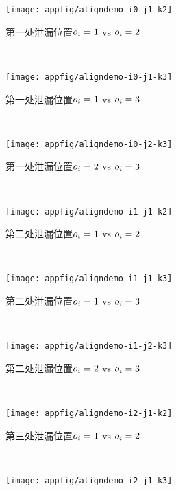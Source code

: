 {	\begin{appfig}[!htb]
		\centering
		\begin{subfigure}[b]{\trif\textwidth}
			\texttt{[image: appfig/aligndemo-i0-j1-k2]}
			\caption{第一处泄漏位置$o_i=1$ vs $o_i=2$}
			\label{fig:aligndemo012}
		\end{subfigure}%
		~%
		\begin{subfigure}[b]{\trif\textwidth}
			\texttt{[image: appfig/aligndemo-i0-j1-k3]}
			\caption{第一处泄漏位置$o_i=1$ vs $o_i=3$}
			\label{fig:aligndemo013}
		\end{subfigure}
		~%
		\begin{subfigure}[b]{\trif\textwidth}
			\texttt{[image: appfig/aligndemo-i0-j2-k3]}
			\caption{第一处泄漏位置$o_i=2$ vs $o_i=3$}
			\label{fig:aligndemo023}
		\end{subfigure}
		\\%
		\begin{subfigure}[b]{\trif\textwidth}
			\texttt{[image: appfig/aligndemo-i1-j1-k2]}
			\caption{第二处泄漏位置$o_i=1$ vs $o_i=2$}
			\label{fig:aligndemo112}
		\end{subfigure}%
		~%
		\begin{subfigure}[b]{\trif\textwidth}
			\texttt{[image: appfig/aligndemo-i1-j1-k3]}
			\caption{第二处泄漏位置$o_i=1$ vs $o_i=3$}
			\label{fig:aligndemo113}
		\end{subfigure}
		~%
		\begin{subfigure}[b]{\trif\textwidth}
			\texttt{[image: appfig/aligndemo-i1-j2-k3]}
			\caption{第二处泄漏位置$o_i=2$ vs $o_i=3$}
			\label{fig:aligndemo123}
		\end{subfigure}
		\\%
		\begin{subfigure}[b]{\trif\textwidth}
			\texttt{[image: appfig/aligndemo-i2-j1-k2]}
			\caption{第三处泄漏位置$o_i=1$ vs $o_i=2$}
			\label{fig:aligndemo212}
		\end{subfigure}%
		~%
		\begin{subfigure}[b]{\trif\textwidth}
			\texttt{[image: appfig/aligndemo-i2-j1-k3]}

\end{subfigure}
\end{appfig}}
